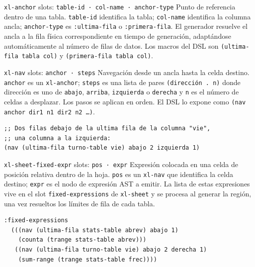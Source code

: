 \documentclass[12pt,a4paper]{report}
\begin{document}
\vspace{0.5em}

\begin{nodobox}{\texttt{xl-anchor} \quad \small\textmd{slots:} \texttt{table-id · col-name · anchor-type}}
Punto de referencia dentro de una tabla. \texttt{table-id} identifica la tabla; \texttt{col-name} identifica la columna ancla; \texttt{anchor-type} es \texttt{:ultima-fila} o \texttt{:primera-fila}. El generador resuelve el ancla a la fila física correspondiente en tiempo de generación, adaptándose automáticamente al número de filas de datos. Los macros del DSL son \texttt{(ultima-fila tabla col)} y \texttt{(primera-fila tabla col)}.
\end{nodobox}

\vspace{0.5em}

\begin{nodobox}{\texttt{xl-nav} \quad \small\textmd{slots:} \texttt{anchor · steps}}
Navegación desde un ancla hasta la celda destino. \texttt{anchor} es un \texttt{xl-anchor}; \texttt{steps} es una lista de pares \texttt{(dirección . n)} donde dirección es uno de \texttt{abajo}, \texttt{arriba}, \texttt{izquierda} o \texttt{derecha} y \texttt{n} es el número de celdas a desplazar. Los pasos se aplican en orden. El DSL lo expone como \texttt{(nav anchor dir1 n1 dir2 n2 \ldots)}.

\begin{lstlisting}
;; Dos filas debajo de la ultima fila de la columna "vie",
;; una columna a la izquierda:
(nav (ultima-fila turno-table vie) abajo 2 izquierda 1)
\end{lstlisting}
\end{nodobox}

\vspace{0.5em}

\begin{nodobox}{\texttt{xl-sheet-fixed-expr} \quad \small\textmd{slots:} \texttt{pos · expr}}
Expresión colocada en una celda de posición relativa dentro de la hoja. \texttt{pos} es un \texttt{xl-nav} que identifica la celda destino; \texttt{expr} es el nodo de expresión AST a emitir. La lista de estas expresiones vive en el slot \texttt{fixed-expressions} de \texttt{xl-sheet} y se procesa al generar la región, una vez resueltos los límites de fila de cada tabla.

\begin{lstlisting}
:fixed-expressions
  (((nav (ultima-fila stats-table abrev) abajo 1)
    (counta (trange stats-table abrev)))
   ((nav (ultima-fila turno-table vie) abajo 2 derecha 1)
    (sum-range (trange stats-table frec))))
\end{lstlisting}
\end{nodobox}
\end{document}
